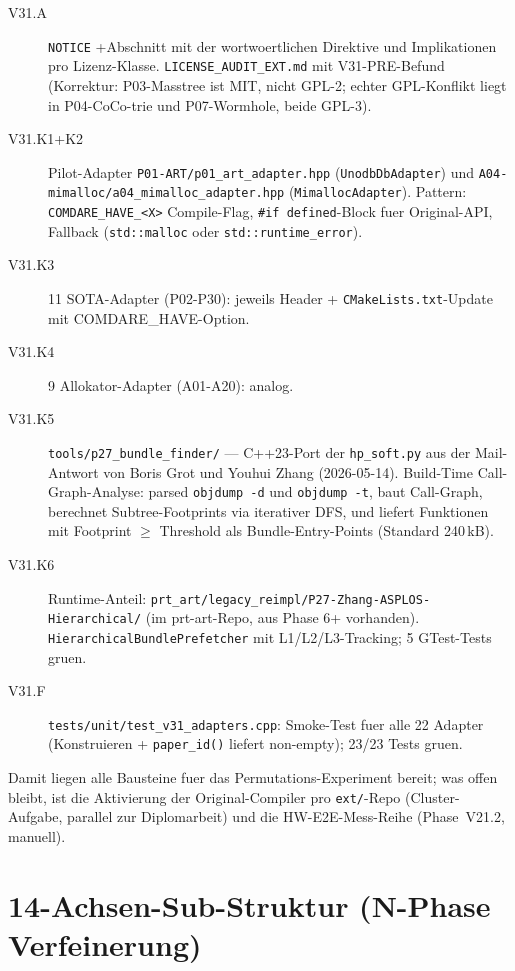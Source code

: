 \begin{description}
    \item[V31.A] \texttt{NOTICE} +Abschnitt mit der wortwoertlichen
          Direktive und Implikationen pro Lizenz-Klasse.
          \texttt{LICENSE\_AUDIT\_EXT.md} mit V31-PRE-Befund (Korrektur:
          P03-Masstree ist MIT, nicht GPL-2; echter GPL-Konflikt liegt
          in P04-CoCo-trie und P07-Wormhole, beide GPL-3).
    \item[V31.K1+K2] Pilot-Adapter \texttt{P01-ART/p01\_art\_adapter.hpp}
          (\texttt{UnodbDbAdapter}) und
          \texttt{A04-mimalloc/a04\_mimalloc\_adapter.hpp}
          (\texttt{MimallocAdapter}). Pattern: \texttt{COMDARE\_HAVE\_<X>}
          Compile-Flag, \texttt{\#if defined}-Block fuer Original-API,
          Fallback (\texttt{std::malloc} oder
          \texttt{std::runtime\_error}).
    \item[V31.K3] 11 SOTA-Adapter (P02-P30): jeweils Header +
          \texttt{CMakeLists.txt}-Update mit COMDARE\_HAVE-Option.
    \item[V31.K4] 9 Allokator-Adapter (A01-A20): analog.
    \item[V31.K5] \texttt{tools/p27\_bundle\_finder/} --- C++23-Port der
          \texttt{hp\_soft.py} aus der Mail-Antwort von Boris Grot und
          Youhui Zhang (2026-05-14). Build-Time Call-Graph-Analyse:
          parsed \texttt{objdump -d} und \texttt{objdump -t}, baut
          Call-Graph, berechnet Subtree-Footprints via iterativer DFS,
          und liefert Funktionen mit Footprint $\geq$ Threshold als
          Bundle-Entry-Points (Standard 240\,kB).
    \item[V31.K6] Runtime-Anteil:
          \texttt{prt\_art/legacy\_reimpl/P27-Zhang-ASPLOS-Hierarchical/}
          (im prt-art-Repo, aus Phase 6+ vorhanden).
          \texttt{HierarchicalBundlePrefetcher} mit L1/L2/L3-Tracking;
          5 GTest-Tests gruen.
    \item[V31.F] \texttt{tests/unit/test\_v31\_adapters.cpp}: Smoke-Test
          fuer alle 22 Adapter (Konstruieren + \texttt{paper\_id()}
          liefert non-empty); 23/23 Tests gruen.
\end{description}

Damit liegen alle Bausteine fuer das Permutations-Experiment
bereit; was offen bleibt, ist die Aktivierung der Original-Compiler
pro \texttt{ext/}-Repo (Cluster-Aufgabe, parallel zur Diplomarbeit) und
die HW-E2E-Mess-Reihe (Phase~V21.2, manuell).

\section{14-Achsen-Sub-Struktur (N-Phase Verfeinerung)}\label{sec:14-achsen-substruktur}

